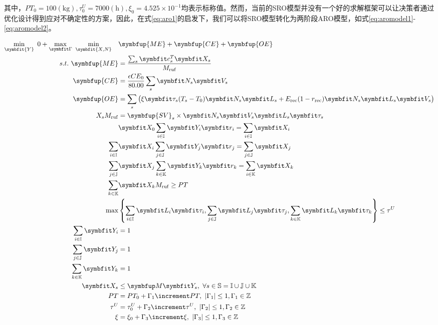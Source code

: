 其中，$PT_0=100(\mathrm{kg}), \tau^U_0 = 7000({\mathrm h}), \xi_0=4.525\times 10^{-1}$均表示标称值。然而，当前的SRO模型并没有一个好的求解框架可以让决策者通过优化设计得到应对不确定性的方案，因此，在式\eqref{eq:aro1}的启发下，我们可以将SRO模型转化为两阶段ARO模型，如式\eqref{eq:aromodel1}-\eqref{eq:aromodel2}。

\begin{align}
  \min_{\symbfit{Y}}\ 0 + \max_{\symbfit \Gamma}\ \min_{\symbfit{X,N}}\quad & \symbfup{ME} + \symbfup{CE} + \symbfup{OE} \label{eq:aromodel1} \\
  s.t.\ \symbfup{ME} &= \frac{\sum_{s}\symbfit c_s^T\symbfit X_s}{M_{\rm ruf}} \\
   \symbfup{CE} &= \frac{\epsilon CE_0}{80.00}\sum_{s}\symbfit N_s\symbfit V_s \\
   \symbfup{OE} &= \sum_s \big(\xi\symbfit\tau_s(T_s-T_0)\symbfit N_s\symbfit L_s +E_{\rm rec}(1-r_{\rm rec})\symbfit N_s\symbfit L_s\symbfit V_s\big) \\
   X_sM_{\rm ruf} &= \symbfup{SV}_s\times\symbfit N_s\symbfit V_s\symbfit L_s\symbfit\tau_{s} \\
   &\symbfit X_0\sum_{i\in\mathbb I}\symbfit Y_i\symbfit r_i=\sum_{i\in\mathbb I}\symbfit X_i \\
  \sum_{i\in\mathbb I}&\symbfit X_i\sum_{j\in\mathbb J}\symbfit Y_j\symbfit r_j=\sum_{j\in\mathbb J}\symbfit X_j \\
  \sum_{j\in\mathbb J}&\symbfit X_j\sum_{k\in\mathbb K}\symbfit Y_k\symbfit r_k=\sum_{i\in\mathbb K}\symbfit X_k \\
  \sum_{k\in\mathbb K}&\symbfit X_kM_{\rm ruf}\ge PT \\
  \max&\left\{\sum_{i\in\mathbb I}\symbfit L_i\symbfit\tau_i,\sum_{j\in\mathbb J}\symbfit L_j\symbfit\tau_j,\sum_{k\in\mathbb K}\symbfit L_k\symbfit\tau_k\right\} \le \tau^U \\
  \sum_{i\in\mathbb I}\symbfit Y_i&=1  \\
  \sum_{j\in\mathbb J}\symbfit Y_j&=1 \\ 
  \sum_{k\in\mathbb K}\symbfit Y_k&=1 \\
  \symbfit X_s &\le \symbfup M\symbfit Y_s,\ \forall s\in \mathbb S = \mathbb I \cup\mathbb J\cup\mathbb K \\
  PT &= PT_0 + \Gamma_1\increment PT,\ |\Gamma_1|\le 1, \Gamma_1\in\mathbb Z \\
  \tau^U &= \tau_0^U + \Gamma_2\increment \tau^U,\ |\Gamma_2|\le 1, \Gamma_2\in\mathbb Z \\
  \xi &= \xi_0 + \Gamma_3\increment\xi,\ |\Gamma_3|\le 1, \Gamma_3\in\mathbb Z \label{eq:aromodel2}
\end{align}

